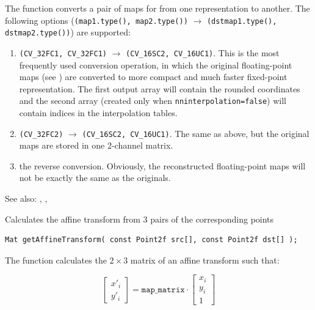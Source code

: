 The function converts a pair of maps for  from one representation to another. The following options (\texttt{(map1.type(), map2.type())} $\rightarrow$ \texttt{(dstmap1.type(), dstmap2.type())}) are supported:
\begin{enumerate}
    \item \texttt{(CV\_32FC1, CV\_32FC1)} $\rightarrow$ \texttt{(CV\_16SC2, CV\_16UC1)}. This is the most frequently used conversion operation, in which the original floating-point maps (see ) are converted to more compact and much faster fixed-point representation. The first output array will contain the rounded coordinates and the second array (created only when \texttt{nninterpolation=false}) will contain indices in the interpolation tables.   
    \item \texttt{(CV\_32FC2)} $\rightarrow$ \texttt{(CV\_16SC2, CV\_16UC1)}. The same as above, but the original maps are stored in one 2-channel matrix.
    \item the reverse conversion. Obviously, the reconstructed floating-point maps will not be exactly the same as the originals.
\end{enumerate} 

See also: , , 

\label{getAffineTransform}
Calculates the affine transform from 3 pairs of the corresponding points

\begin{lstlisting}
Mat getAffineTransform( const Point2f src[], const Point2f dst[] );
\end{lstlisting}

\begin{description}
\end{description}

The function calculates the $2 \times 3$ matrix of an affine transform such that:

\[
\begin{bmatrix}
x'_i\\
y'_i
\end{bmatrix}
=
\texttt{map\_matrix}
\cdot
\begin{bmatrix}
x_i\\
y_i\\
1
\end{bmatrix}
\]

